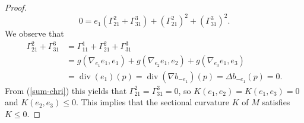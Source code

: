 \documentclass[12pt,a4paper]{amsart}
\theoremstyle{definition}
\theoremstyle{remark}
\newcommand \<{\langle}
\renewcommand \>{\rangle}
\begin{document}
\begin{proof}
\begin{equation}\label{sum-chri}
    0 = e_1 \left(\Gamma_{21}^2  +  \Gamma_{31}^3\right) +\left(\Gamma_{21}^2\right)^2+\left(\Gamma_{31}^3\right)^2.
\end{equation}
We observe that
\begin{align*}
    \Gamma_{21}^2  +  \Gamma_{31}^3 &= \Gamma_{11}^1 + \Gamma_{21}^2  +  \Gamma_{31}^3 \\
    &=g(\nabla_{e_1}e_1, e_1)+g(\nabla_{e_2}e_1, e_2)+g(\nabla_{e_3}e_1, e_3)\\
    &=\operatorname{div}(e_1)(p) = \operatorname{div}(\nabla b_{-e_1})(p) = \Delta b_{-e_1}(p) = 0.
\end{align*}
 From  (\ref{sum-chri})  this yields that  $\Gamma_{21}^2  = \Gamma_{31}^3=0$, so $K(e_1 ,e_2)=K(e_1, e_3)=0$ and $K(e_2, e_3) \le 0$. This implies that the sectional curvature $K$ of $M$ satisfies $K\le 0$.
\end{proof}
\end{document}
